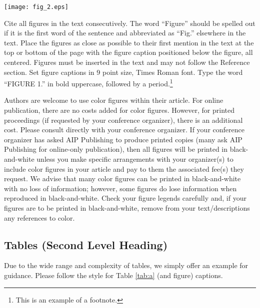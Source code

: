 \documentclass{aip-cp}
\begin{document}
\begin{sidewaysfigure}
  \centerline{\texttt{[image: fig\_2.eps]}}
  \caption{To format a figure caption use the \LaTeX template style: Figure Caption. The text ``FIGURE 2,'' which labels the caption, should be bold and in upper case. If figures have more than one part, each part should be labeled (a), (b), etc. Using a table, as in the above example, helps you control the layout.}
\end{sidewaysfigure}

Cite all figures in the text consecutively. The word ``Figure'' should be spelled out if it is the first word of the sentence and abbreviated as ``Fig.'' elsewhere in the text. Place the figures as close as possible to their first mention in the text at the top or bottom of the page with the figure caption positioned below the figure, all centered. Figures must be inserted in the text and may not follow the Reference section. Set figure captions in 9 point size, Times Roman font. Type the word ``FIGURE 1.'' in bold uppercase, followed by a period.\footnote{This is an example of a footnote.}


Authors are welcome to use color figures within their article. For online publication, there are no costs added for color figures. However, for printed proceedings (if requested by your conference organizer), there is an additional cost. Please consult directly with your conference organizer. If your conference organizer has asked AIP Publishing to produce printed copies (many ask AIP Publishing for online-only publication), then all figures will be printed in black-and-white unless you make specific arrangements with your organizer(s) to include color figures in your article and pay to them the associated fee(s) they request. We advise that many color figures can be printed in black-and-white with no loss of information; however, some figures do lose information when reproduced in black-and-white. Check your figure legends carefully and, if your figures are to be printed in black-and-white, remove from your text/descriptions any references to color.


\subsection{Tables (Second Level Heading)}
Due to the wide range and complexity of tables, we simply offer an example for guidance. Please follow the style for Table \ref{tab:a} (and figure) captions.
\end{document}
